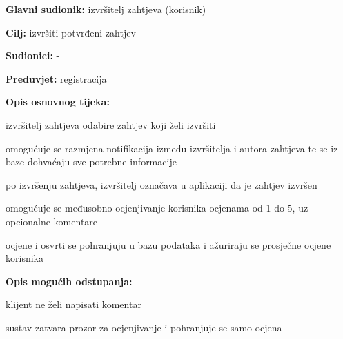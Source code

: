 \begin{packed_item}
	
	\item \textbf{Glavni sudionik: }izvršitelj zahtjeva (korisnik)
	\item  \textbf{Cilj:} izvršiti potvrđeni zahtjev
	\item  \textbf{Sudionici:} -
	\item  \textbf{Preduvjet:} registracija
	\item  \textbf{Opis osnovnog tijeka:}
	
	\item[] \begin{packed_enum}
		
		\item izvršitelj zahtjeva odabire zahtjev koji želi izvršiti
		\item omogućuje se razmjena notifikacija između izvršitelja i autora zahtjeva te se iz baze dohvaćaju sve potrebne informacije
		\item po izvršenju zahtjeva, izvršitelj označava u aplikaciji da je zahtjev izvršen
		\item omogućuje se međusobno ocjenjivanje korisnika ocjenama od 1 do 5, uz opcionalne komentare
		\item ocjene i osvrti se pohranjuju u bazu podataka i ažuriraju se prosječne ocjene korisnika
	\end{packed_enum}
	
	\item  \textbf{Opis mogućih odstupanja:}
	
	\item[] \begin{packed_item}
		
		\item[4.a] klijent ne želi napisati komentar
		\item[] \begin{packed_enum}
			
			\item sustav zatvara prozor za ocjenjivanje i pohranjuje se samo ocjena
			
		\end{packed_enum}
		
	\end{packed_item}
\end{packed_item}
\noindent {}
